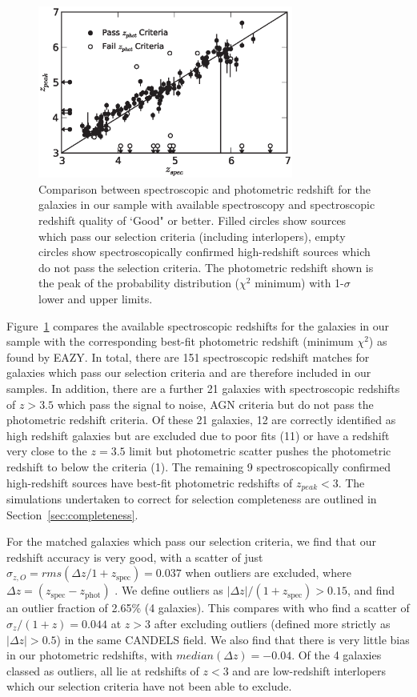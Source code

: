 \begin{figure}
\includegraphics[width=84mm]{plots/fig1.eps}
\caption{Comparison between spectroscopic and photometric redshift for the galaxies in our sample with available spectroscopy and spectroscopic redshift quality of `Good" or better. Filled circles show sources which pass our selection criteria (including interlopers), empty circles show spectroscopically confirmed high-redshift sources which do not pass the selection criteria. The photometric redshift shown is the peak of the probability distribution ($\chi^2$ minimum) with 1-$\sigma$ lower and upper limits.}
\label{fig:specz}
\end{figure}

Figure~\ref{fig:specz} compares the available spectroscopic redshifts for the galaxies in our sample with the corresponding best-fit photometric redshift (minimum $\chi^2$) as found by EAZY. In total, there are 151 spectroscopic redshift matches for galaxies which pass our selection criteria and are therefore included in our samples. In addition, there are a further 21 galaxies with spectroscopic redshifts of $z > 3.5$ which pass the signal to noise, AGN criteria but do not pass the photometric redshift criteria. Of these 21 galaxies, 12 are correctly identified as high redshift galaxies but are excluded due to poor fits (11) or have a redshift very close to the $z = 3.5$ limit but photometric scatter pushes the photometric redshift to below the criteria (1). The remaining 9 spectroscopically confirmed high-redshift sources have best-fit photometric redshifts of $z_{peak} < 3$. The simulations undertaken to correct for selection completeness are outlined in Section~\ref{sec:completeness}.

For the matched galaxies which pass our selection criteria, we find that our redshift accuracy is very good, with a scatter of just $\sigma_{z,O} = rms(\Delta z /1+z_{\text{spec}}) = 0.037$ when outliers are excluded, where $\Delta z =  (z_{\text{spec}}-z_{\text{phot}})$ \citep{Dahlen:2013eu}. We define outliers as $\left | \Delta z \right |/(1+z_{\text{spec}}) > 0.15$, and find an outlier fraction of 2.65\% (4 galaxies). This compares with \citet{2012ApJ...756..164F} who find a scatter of $\sigma_{z}/(1+z) = 0.044$  at $z > 3$ after excluding outliers (defined more strictly as $\left | \Delta z \right | > 0.5$) in the same CANDELS field. We also find that there is very little bias in our photometric redshifts, with $median(\Delta z) = -0.04$. Of the 4 galaxies classed as outliers, all lie at redshifts of $z < 3$ and are low-redshift interlopers which our selection criteria have not been able to exclude.

